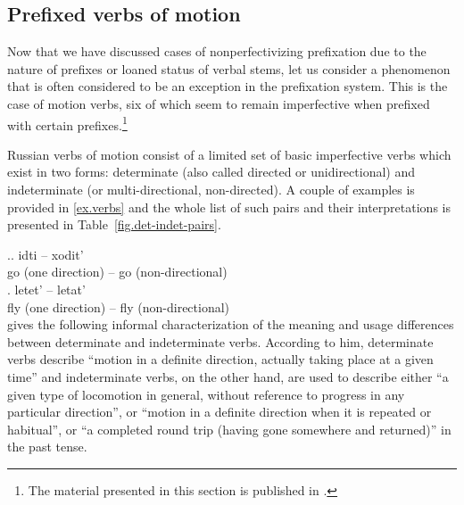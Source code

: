 \subsection{Prefixed verbs of motion}\label{subsection:perf:motion}

Now that we have discussed cases of nonperfectivizing prefixation due to the nature of prefixes or loaned status of verbal stems, let us consider a phenomenon that is often considered to be an exception in the prefixation system. This is the case of motion verbs, six of which seem to remain imperfective when prefixed with certain prefixes.\footnote{The material presented in this section is published in \cite{ZinovaOsswald:paper}.}

Russian verbs of motion consist of a limited set of basic imperfective verbs which exist in two forms: determinate (also called directed or unidirectional) and indeterminate (or multi-directional, non-directed). A couple of examples is provided in \ref{ex.verbs} and the whole list of such pairs and their interpretations is presented in Table~\ref{fig.det-indet-pairs}.

\ex.\label{ex.verbs}\ag. idti -- xodit'\\
{go (one direction)} -- {go (non-directional)}\\
\bg. letet' -- letat'\\
{fly (one direction)} -- {fly (non-directional)}\\

\citet[3f]{Stilman:51} gives the following informal characterization of the meaning and usage differences between determinate and indeterminate verbs. According to him, determinate verbs describe ``motion in a definite direction, actually taking place at a given time'' and indeterminate verbs, on the other hand, are used to describe either ``a given type of locomotion in general, without reference to progress in any particular direction'', or ``motion in a definite direction when it is repeated or habitual'', or ``a completed round trip (having gone somewhere and returned)'' in the past tense.

